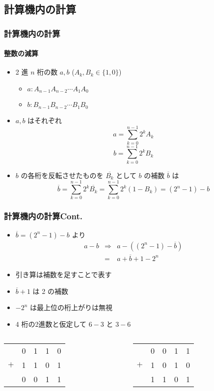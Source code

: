 \subsection{計算機内の計算}
\begin{frame}[shrink]
\frametitle{計算機内の計算}
\framesubtitle{整数の減算}
  \begin{itemize}
\item 2 進 $n$ 桁の数 $a, b$ (\(A_k,B_k\in\{1,0\}\))
    \begin{itemize}
\item \(a\colon A_{n-1}A_{n-2}\cdots A_{1}A_{0}\)
\item \(b\colon B_{n-1}B_{n-2}\cdots B_{1}B_{0}\)
    \end{itemize}
\item \(a, b\) はそれぞれ
\[a=\sum_{k=0}^{n-1}2^{k}A_{k}\]
\[b=\sum_{k=0}^{n-1}2^{k}B_{k}\]
\item $b$ の各桁を反転させたものを \(\overline{B_{k}}\) として $b$ の補数 \(\overline{b}\) は
\[\overline{b}=\sum_{k=0}^{n-1}2^{k}\overline{B_{k}}=\sum_{k=0}^{n-1}2^{k}(1-B_{k})=(2^n-1)-b\]
  \end{itemize}
\end{frame}
\begin{frame}[shrink]
\frametitle{計算機内の計算\textemdash Cont.}
  \begin{itemize}
\item \(\overline{b}=(2^n-1)-b\) より
    \begin{eqnarray*}
a-b&\Rightarrow& a-((2^n-1)-\overline{b})\\
   &=&a+\overline{b}+1-2^n
    \end{eqnarray*}
\item 引き算は補数を足すことで表す
\item \(\overline{b}+1\) は 2 の補数
\item \(-2^n\) は最上位の桁上がりは無視
  \end{itemize}
  \begin{example}[引き算の例]
    \begin{itemize}
\item 4 桁の2進数と仮定して \(6-3\) と \(3-6\)
    \end{itemize}
    \begin{columns}[t]
      \begin{column}{3.5cm}
        \begin{tabular}{ccccc}
&0&1&1&0\\
$+$&1&1&0&1\\
\hline
&0&0&1&1\\
        \end{tabular}
      \end{column}
      \begin{column}{3.5cm}
        \begin{tabular}{ccccc}
&0&0&1&1\\
$+$&1&0&1&0\\
\hline
&1&1&0&1\\
        \end{tabular}
      \end{column}
    \end{columns}
  \end{example}
\end{frame}
